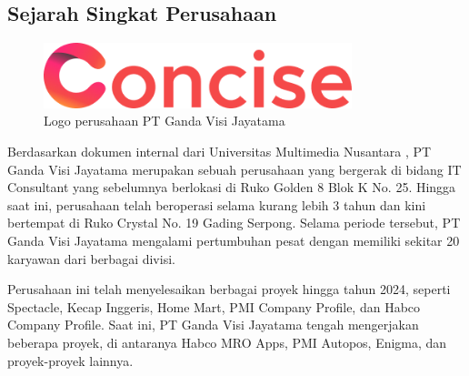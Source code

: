 \chapter{\babDua}

\section{Sejarah Singkat Perusahaan}

\begin{figure}[H]
    \centering
    \includegraphics[width=0.8\textwidth]{assets/pics/conciseLogo.png}
    \caption{Logo perusahaan PT Ganda Visi Jayatama}
    \label{concise-logo}
\end{figure}

Berdasarkan dokumen internal dari Universitas Multimedia Nusantara \cite{umn2023}, 
PT Ganda Visi Jayatama merupakan sebuah perusahaan yang bergerak di bidang IT Consultant 
yang sebelumnya berlokasi di Ruko Golden 8 Blok K No. 25. Hingga saat ini, perusahaan 
telah beroperasi selama kurang lebih 3 tahun dan kini bertempat di Ruko Crystal No. 19 
Gading Serpong. Selama periode tersebut, PT Ganda Visi Jayatama mengalami pertumbuhan 
pesat dengan memiliki sekitar 20 karyawan dari berbagai divisi. 

Perusahaan ini telah menyelesaikan berbagai proyek hingga tahun 2024, seperti 
Spectacle, Kecap Inggeris, Home Mart, PMI Company Profile, dan Habco Company 
Profile. Saat ini, PT Ganda Visi Jayatama tengah mengerjakan beberapa proyek, di 
antaranya Habco MRO Apps, PMI Autopos, Enigma, dan proyek-proyek lainnya.



